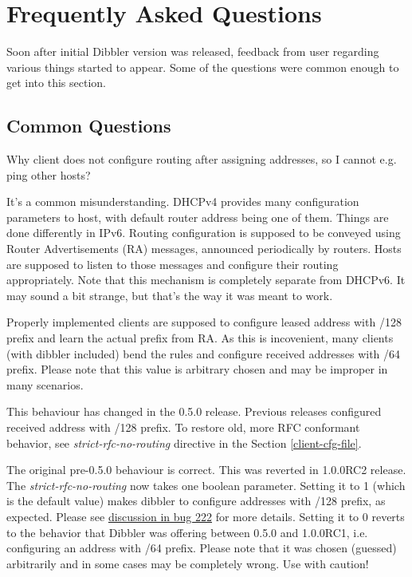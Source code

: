 
\newpage
\section{Frequently Asked Questions}

Soon after initial Dibbler version was released, feedback from user
regarding various things started to appear. Some of the questions were
common enough to get into this section.

\subsection{Common Questions}

\Q Why client does not configure routing after assigning addresses, so
I cannot e.g. ping other hosts?

\A It's a common misunderstanding. DHCPv4 provides many configuration
parameters to host, with default router address being one of
them. Things are done differently in IPv6. Routing configuration is
supposed to be conveyed using Router Advertisements (RA) messages,
announced periodically by routers. Hosts are supposed to listen to
those messages and configure their routing appropriately. Note that
this mechanism is completely separate from DHCPv6. It may sound a bit
strange, but that's the way it was meant to work.

Properly implemented clients are supposed to configure leased address
with /128 prefix and learn the actual prefix from RA. As this is
incovenient, many clients (with dibbler included) bend the rules and
configure received addresses with /64 prefix. Please note that this
value is arbitrary chosen and may be improper in many scenarios.

\Note This behaviour has changed in the 0.5.0 release. Previous
releases configured received address with /128 prefix. To restore old,
more RFC conformant behavior, see \emph{strict-rfc-no-routing}
directive in the Section \ref{client-cfg-file}.

\Note The original pre-0.5.0 behaviour is correct. This was reverted
in 1.0.0RC2 release. The \emph{strict-rfc-no-routing} now takes one
boolean parameter. Setting it to 1 (which is the default value) makes
dibbler to configure addresses with /128 prefix, as expected. Please
see \href{http://klub.com.pl/bugzilla3/show_bug.cgi?id=222}{discussion
in bug 222} for more details. Setting it to 0 reverts to the behavior
that Dibbler was offering between 0.5.0 and 1.0.0RC1, i.e. configuring
an address with /64 prefix. Please note that it was chosen (guessed)
arbitrarily and in some cases may be completely wrong. Use with caution!

